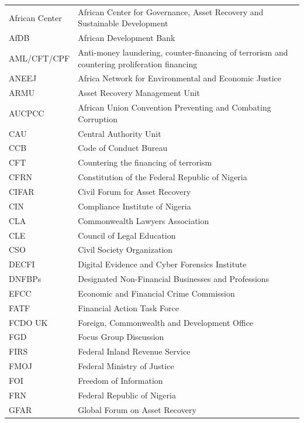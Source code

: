 \documentclass[
  letterpaper,
  DIV=11,
  numbers=noendperiod]{scrreprt}
\begin{document}
\begin{longtable}[]{@{}
  >{\raggedright\arraybackslash}p{}
  >{\raggedright\arraybackslash}p{}@{}}
\toprule\noalign{}
\endhead
\bottomrule\noalign{}
\endlastfoot
African Center & African Center for Governance, Asset Recovery and
Sustainable Development \\
AfDB & African Development Bank \\
AML/CFT/CPF & Anti-money laundering, counter-financing of terrorism and
countering proliferation financing \\
ANEEJ & Africa Network for Environmental and Economic Justice \\
ARMU & Asset Recovery Management Unit \\
AUCPCC & African Union Convention Preventing and Combating Corruption \\
CAU & Central Authority Unit \\
CCB & Code of Conduct Bureau \\
CFT & Countering the financing of terrorism \\
CFRN & Constitution of the Federal Republic of Nigeria \\
CIFAR & Civil Forum for Asset Recovery \\
CIN & Compliance Institute of Nigeria \\
CLA & Commonwealth Lawyers Association \\
CLE & Council of Legal Education \\
CSO & Civil Society Organization \\
DECFI & Digital Evidence and Cyber Forensics Institute \\
DNFBPs & Designated Non-Financial Businesses and Professions \\
EFCC & Economic and Financial Crime Commission \\
FATF & Financial Action Task Force \\
FCDO UK & Foreign, Commonwealth and Development Office \\
FGD & Focus Group Discussion \\
FIRS & Federal Inland Revenue Service \\
FMOJ & Federal Ministry of Justice \\
FOI & Freedom of Information \\
FRN & Federal Republic of Nigeria \\
GFAR & Global Forum on Asset Recovery \\

\end{longtable}
\end{document}
